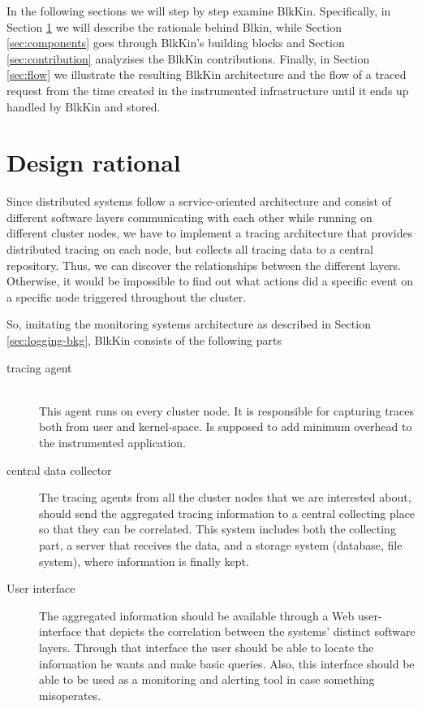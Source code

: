 In the following sections we will step by step examine BlkKin. Specifically, in
Section \ref{sec:rationale} we will describe the rationale behind Blkin, while
Section \ref{sec:components} goes through BlkKin's building blocks and Section
\ref{sec:contribution} analyzises the BlkKin contributions. Finally, in Section
\ref{sec:flow} we illustrate the resulting BlkKin architecture and the flow of a
traced request from the time created in the instrumented infrastructure until it
ends up handled by BlkKin and stored.

\section{Design rational}\label{sec:rationale}

Since distributed systems follow a service-oriented architecture and consist of
different software layers communicating with each other while running on
different cluster nodes, we have to implement a tracing architecture that
provides distributed tracing on each node, but collects all tracing data to a
central repository. Thus, we can discover the relationships between the
different layers. Otherwise, it would be impossible to find out what actions did
a specific event on a specific node triggered throughout the cluster.

So, imitating the monitoring systems architecture as described in Section
\ref{sec:logging-bkg}, BlkKin consists of the following parts

\begin{description}
\item[tracing agent] \hfill \\
This agent runs on every cluster node. It is responsible for capturing traces
both from user and kernel-space. Is supposed to add minimum overhead to the
instrumented application.

\item[central data collector]
The tracing agents from all the cluster nodes that we are interested about,
should send the aggregated tracing information to a central collecting place so
that they can be correlated. This system includes both the collecting part, a
server that receives the data, and a storage system (database, file system),
where information is finally kept.

\item[User interface]
The aggregated information should be available through a Web user-interface that
depicts the correlation between the systems' distinct software layers. Through
that interface the user should be able to locate the information he wants and
make basic queries. Also, this interface should be able to be used as a
monitoring and alerting tool in case something misoperates.

\end{description}

